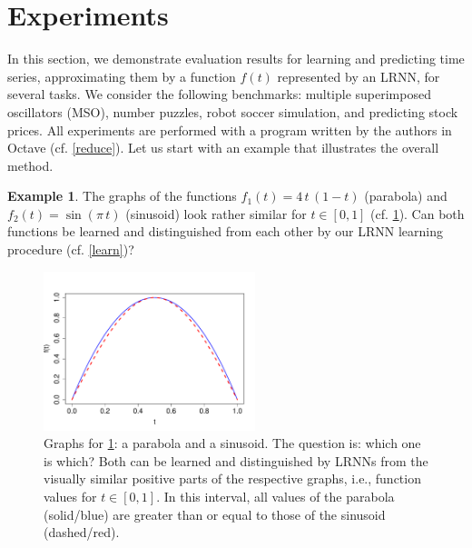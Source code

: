 \documentclass[preprint,12pt,times,authoryear]{elsarticle}%
\theoremstyle{definition}
\newtheorem{exmp}{Example}
\begin{document}
\section{Experiments}\label{result}

In this section, we demonstrate evaluation results for learning and predicting
time series, approximating them by a function $f(t)$ represented by an LRNN,
for several tasks. We consider the following benchmarks: multiple superimposed
oscillators (MSO), number puzzles, robot soccer simulation, and predicting stock
prices. All experiments are performed with a program written by the authors in
Octave \citep{EB+17} (cf. \cref{reduce}). Let us start with an example that
illustrates the overall method.

\begin{exmp}\label{quest}
The graphs of the functions $f_1(t) = 4\,t\,(1-t)$ (parabola) and $f_2(t) =
\sin(\pi\,t)$ (sinusoid) look rather similar for $t \in [0,1]$ (cf.
\cref{parasin}). Can both functions be learned and distinguished from each other
by our LRNN learning procedure (cf. \cref{learn})?
\end{exmp}

\begin{figure}
	\centering
	\includegraphics[width=0.55\textwidth]{fig/parasin2}
	\caption{Graphs for \cref{quest}: a parabola and a sinusoid.
	The question is: which one is which? Both can be learned and
	distinguished by LRNNs from the visually similar positive parts of the
	respective graphs, i.e., function values for $t \in [0, 1]$. In this
	interval, all values of the parabola (solid/blue) are greater than or equal
	to those of the sinusoid (dashed/red).}
	\label{parasin}
\end{figure}
\end{document}
